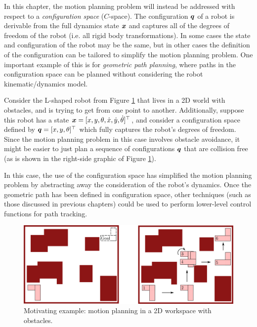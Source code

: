 In this chapter, the motion planning problem will instead be addressed with respect to a \textit{configuration space} ($C$-space).
The configuration $\bm{q}$ of a robot is derivable from the full dynamics state $\bm{x}$ and captures all of the degrees of freedom of the robot (i.e. all rigid body transformations). In some cases the state and configuration of the robot may be the same, but in other cases the definition of the configuration can be tailored to simplify the motion planning problem. One important example of this is for \textit{geometric path planning}, where paths in the configuration space can be planned without considering the robot kinematic/dynamics model.

\begin{example} \label{ex:mot}
\theoremstyle{definition}
Consider the L-shaped robot from Figure \ref{fig:2dworkspace} that lives in a 2D world with obstacles, and is trying to get from one point to another. Additionally, suppose this robot has a state $\bm{x} = [x,y,\theta,\dot{x}, \dot{y}, \dot{\theta}]^\top $, and consider a configuration space defined by $\bm{q} = [x,y,\theta]^\top $ which fully captures the robot's degrees of freedom. Since the motion planning problem in this case involves obstacle avoidance, it might be easier to just plan a sequence of configurations $\bm{q}$ that are collision free (as is shown in the right-side graphic of Figure \ref{fig:2dworkspace}).

In this case, the use of the configuration space has simplified the motion planning problem by abstracting away the consideration of the robot's dynamics. Once the geometric path has been defined in configuration space, other techniques (such as those discussed in previous chapters) could be used to perform lower-level control functions for path tracking.
\begin{figure}[ht] 
    \centering 
    \includegraphics[width=0.85\linewidth]{tex/figs/ch05_figs/2d_ws_obstacles.png}
    \caption{Motivating example: motion planning in a 2D workspace with obstacles.}
    \label{fig:2dworkspace} 
\end{figure}


\end{example}
